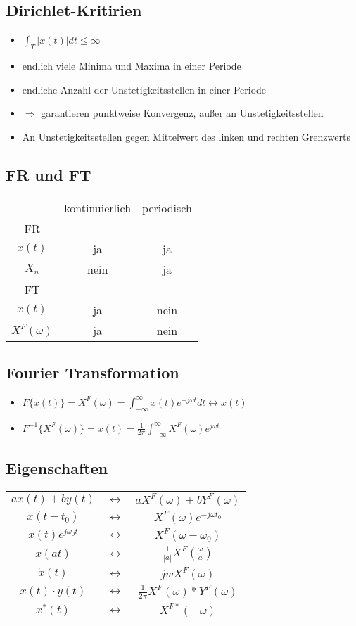 \documentclass{article}
\begin{document}
\subsection{Dirichlet-Kritirien}
\begin{itemize}
\item $\int_T |x(t)|dt \leq \infty$
\item endlich viele Minima und Maxima in einer Periode
\item endliche Anzahl der Unstetigkeitsstellen in einer Periode
\item $\Rightarrow$ garantieren punktweise Konvergenz, außer an Unstetigkeitsstellen
\item An Unstetigkeitsstellen gegen Mittelwert des linken und rechten Grenzwerts
\end{itemize}



\subsection{FR und FT}
\begin{tabular}{ c| c| c }
& kontinuierlich & periodisch \\
FR & & \\ \hline
$x(t)$ & ja & ja \\
 $X_n$ &nein& ja\\
 FT & & \\ \hline
 $x(t)$ & ja & nein \\
 $X^F(\omega)$ & ja & nein \\
\end{tabular}

\subsection{Fourier Transformation}
\begin{itemize}
\item $F\{x(t)\} = X^F(\omega) = \int_{-\infty}^\infty x(t) e^{-j\omega t} dt \leftrightarrow x(t)$
\item $F^{-1}\{X^F(\omega)\} = x(t) = \frac{1}{2\pi}\int_{-\infty}^\infty X^F(\omega) e^{j\omega t}$
\end{itemize}

\subsection{Eigenschaften}
\begin{tabular}{c c c}
$ax(t)+by(t)$ & $\leftrightarrow$ & $aX^F(\omega)+bY^F(\omega)$\\
$x(t-t_0)$ & $\leftrightarrow$ & $X^F(\omega)e^{-j\omega t_0}$\\
$x(t)e^{j\omega_0t}$ & $\leftrightarrow$ & $X^F(\omega-\omega_0)$\\
$x(at)$ & $\leftrightarrow$ & $\frac{1}{|a|}X^F(\frac{\omega}{a})$\\
$\dot{x}(t)$ & $\leftrightarrow$ & $ jw X^F(\omega)$\\
$x(t)\cdot y(t)$ & $\leftrightarrow$ & $\frac{1}{2\pi}X^F(\omega)*Y^F(\omega)$\\
$x^*(t)$ & $\leftrightarrow$ & $X^{F*}(-\omega)$\\
\end{tabular}
\end{document}
